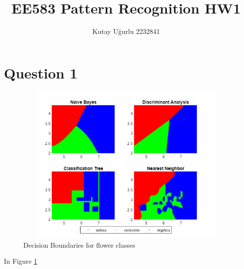 \documentclass[11pt]{extarticle}
\author{Kutay U\u{g}urlu 2232841}
\begin{document}
   


\fancyfoot[C]{\thepage}
\title{\LARGE \LARGE EE583 Pattern Recognition HW1}

\maketitle{\LARGE}

\pagebreak
\section*{Question 1}

{\centering
    \begin{figure}[h]
        \includegraphics[width=12cm, height=8cm]{q1_output.png}
        \caption{Decision Boundaries for flower classes}
        \label{fig:q1figure}
    \end{figure}
}

In Figure \ref{fig:q1figure} 
\end{document}
